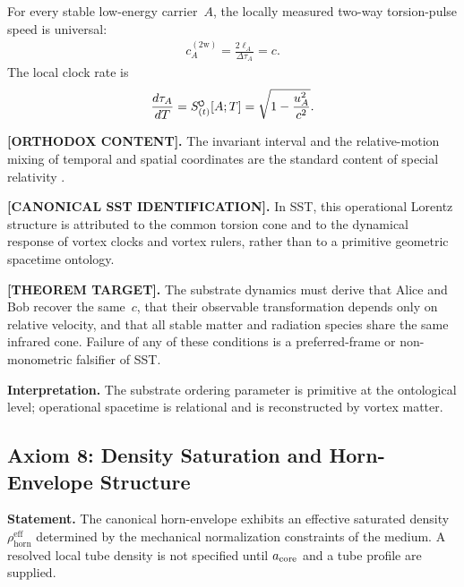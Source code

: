 \documentclass[11pt]{article}
\theoremstyle{definition}
\theoremstyle{plain}
\theoremstyle{remark}
\newcommand{\swirlarrow}{\mathchoice{\mkern-2mu\scriptstyle\boldsymbol{\circlearrowleft}}{\mkern-2mu\scriptstyle\boldsymbol{\circlearrowleft}}{\mkern-2mu\scriptscriptstyle\boldsymbol{\circlearrowleft}}{\mkern-2mu\scriptscriptstyle\boldsymbol{\circlearrowleft}}}
\newcommand{\rhohorn}{\rho_{\mathrm{horn}}^{\mathrm{eff}}}
\newcommand{\SwirlClock}{{S_{(t)}^{\swirlarrow}}}
\begin{document}
        For every stable low-energy carrier~\(A\), the locally measured two-way torsion-pulse speed is universal:
        \begin{align}
            c_A^{(2\mathrm w)}
            =
            \frac{2\ell_A}{\Delta\tau_A}
            =c.
            \label{eq:axiom_vortex_atom_luminal_torsion}
        \end{align}
        The local clock rate is
        \begin{align}
            \frac{d\tau_A}{dT}
            =
            \SwirlClock[A;T]
            =
            \sqrt{1-\frac{u_A^2}{c^2}}.
            \label{eq:axiom_operational_swirl_clock}
        \end{align}

        \textbf{[ORTHODOX CONTENT].}
        The invariant interval and the relative-motion mixing of temporal and spatial coordinates are the standard content of special relativity \cite{Einstein1905}.

        \textbf{[CANONICAL SST IDENTIFICATION].}
        In SST, this operational Lorentz structure is attributed to the common torsion cone and to the dynamical response of vortex clocks and vortex rulers, rather than to a primitive geometric spacetime ontology.

        \textbf{[THEOREM TARGET].}
        The substrate dynamics must derive that Alice and Bob recover the same~\(c\), that their observable transformation depends only on relative velocity, and that all stable matter and radiation species share the same infrared cone. Failure of any of these conditions is a preferred-frame or non-monometric falsifier of SST.

        \textbf{Interpretation.}
        The substrate ordering parameter is primitive at the ontological level; operational spacetime is relational and is reconstructed by vortex matter.
    
    \subsection{Axiom 8: Density Saturation and Horn-Envelope Structure}
        
        \textbf{Statement.}
        The canonical horn-envelope exhibits an effective saturated density
        \(\rhohorn\) determined by the mechanical normalization constraints of the
        medium. A resolved local tube density is not specified until
        \(a_{\rm core}\) and a tube profile are supplied.
        
\end{document}
